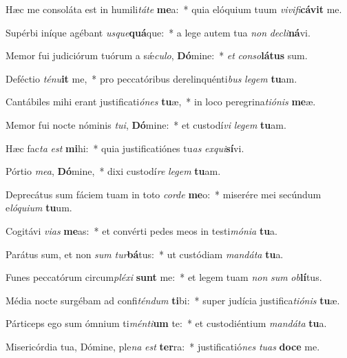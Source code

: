 \item Hæc me consoláta est in humili\textit{tá}\textit{te} \textbf{me}a:~* quia elóquium tuum \textit{vi}\textit{vi}\textit{fi}\textbf{cá}\textbf{vit} me.
\item Supérbi iníque agébant \textit{us}\textit{que}\textbf{quá}que:~* a lege autem tua \textit{non} \textit{de}\textit{cli}\textbf{ná}vi.
\item Memor fui judiciórum tuórum a sǽ\textit{cu}\textit{lo}, \textbf{Dó}mine:~* \textit{et} \textit{con}\textit{so}\textbf{lá}\textbf{tus} sum.
\item Deféctio \textit{té}\textit{nu}\textbf{it} me,~* pro peccatóribus derelinquénti\textit{bus} \textit{le}\textit{gem} \textbf{tu}am.
\item Cantábiles mihi erant justificati\textit{ó}\textit{nes} \textbf{tu}æ,~* in loco peregrina\textit{ti}\textit{ó}\textit{nis} \textbf{me}æ.
\item Memor fui nocte nóminis \textit{tu}\textit{i}, \textbf{Dó}mine:~* et custodí\textit{vi} \textit{le}\textit{gem} \textbf{tu}am.
\item Hæc fac\textit{ta} \textit{est} \textbf{mi}hi:~* quia justificatiónes tu\textit{as} \textit{ex}\textit{qui}\textbf{sí}vi.
\item Pórtio \textit{me}\textit{a}, \textbf{Dó}mine,~* dixi custodí\textit{re} \textit{le}\textit{gem} \textbf{tu}am.
\item Deprecátus sum fáciem tuam in toto \textit{cor}\textit{de} \textbf{me}o:~* miserére mei secúndum e\textit{ló}\textit{qui}\textit{um} \textbf{tu}um.
\item Cogitávi \textit{vi}\textit{as} \textbf{me}as:~* et convérti pedes meos in testi\textit{mó}\textit{ni}\textit{a} \textbf{tu}a.
\item Parátus sum, et non \textit{sum} \textit{tur}\textbf{bá}tus:~* ut custódiam \textit{man}\textit{dá}\textit{ta} \textbf{tu}a.
\item Funes peccatórum circum\textit{plé}\textit{xi} \textbf{sunt} me:~* et legem tuam \textit{non} \textit{sum} \textit{ob}\textbf{lí}tus.
\item Média nocte surgébam ad confi\textit{tén}\textit{dum} \textbf{ti}bi:~* super judícia justifica\textit{ti}\textit{ó}\textit{nis} \textbf{tu}æ.
\item Párticeps ego sum ómnium ti\textit{mén}\textit{ti}\textbf{um} te:~* et custodiéntium \textit{man}\textit{dá}\textit{ta} \textbf{tu}a.
\item Misericórdia tua, Dómine, ple\textit{na} \textit{est} \textbf{ter}ra:~* justificatió\textit{nes} \textit{tu}\textit{as} \textbf{do}\textbf{ce} me.
